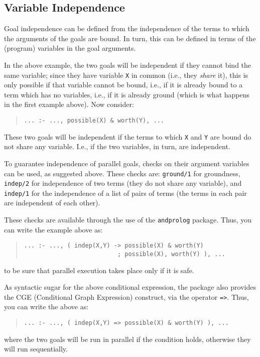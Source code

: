 \subsection{Variable Independence}

Goal independence can be defined from the independence of the terms to
which the arguments of the goals are bound. In turn, this can be
defined in terms of the (program) variables in the goal arguments.

In the above example, the two goals will be independent if they cannot
bind the same variable; since they have variable \verb+X+ in common
(i.e., they {\em share} it), this is only possible if that variable
cannot be bound, i.e., if it is already bound to a term which has no
variables, i.e., if it is already ground (which is what happens in the
first example above). Now consider:
\begin{quote}
\begin{verbatim}
... :- ..., possible(X) & worth(Y), ...
\end{verbatim}
\end{quote}

These two goals will be independent if the terms to which \verb+X+ and
\verb+Y+ are bound do not share any variable. I.e., if the two
variables, in turn, are independent.

To guarantee independence of parallel goals, checks on their argument
variables can be used, as suggested above. These checks are:
\verb+ground/1+ for groundness, \verb+indep/2+ for independence of two
terms (they do not share any variable), and \verb+indep/1+ for the
independence of a list of pairs of terms (the terms in each pair are
independent of each other). 

These checks are available through the use of the \verb+andprolog+
package. Thus, you can write the example above as:
\begin{quote}
\begin{verbatim}
... :- ..., ( indep(X,Y) -> possible(X) & worth(Y)
                          ; possible(X), worth(Y) ), ...
\end{verbatim}
\end{quote}
%
to be sure that parallel execution takes place only if it is safe.

As syntactic sugar for the above conditional expression, the package
also provides the CGE (Conditional Graph Expression) construct, via
the operator \verb+=>+. Thus, you can write the above as:
\begin{quote}
\begin{verbatim}
... :- ..., ( indep(X,Y) => possible(X) & worth(Y) ), ...
\end{verbatim}
\end{quote}
%
where the two goals will be run in parallel if the condition holds,
otherwise they will run sequentially.

